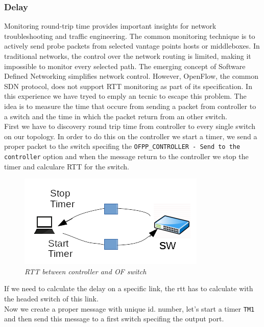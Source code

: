 \documentclass[article,10pt]{IEEEtran}
\begin{document}
\subsubsection{Delay}
Monitoring round-trip time provides important insights for network troubleshooting and traffic engineering.
The  common  monitoring  technique  is  to  actively  send  probe packets  from  selected  vantage  points  hosts  or  middleboxes.
In traditional  networks, the control over the network routing is
limited,  making  it  impossible  to  monitor  every  selected  path. The  emerging  concept  of  Software  Defined  Networking  simplifies
network  control.  However,  OpenFlow,  the  common  SDN protocol,   does   not   support   RTT   monitoring   as   part   of   its
specification. In this experience we have tryed to emply an tecnic to escape this problem\cite{rtt}.
\newline The idea is to measure the time that occure from sending a packet from controller to a switch and the time in which the packet return from
an other switch.
\\
\newline First we have to discovery round trip time from controller to every single switch on our topology.
In order to do this on the controller we start a timer, we send a proper packet to the switch specifing the \texttt{OFPP_CONTROLLER - Send to the controller}
option and when the message return to the controller we stop the timer and calculare RTT for the switch.
\begin{figure}[!h]
 \centering
 \includegraphics[scale=0.70]{images/rtt2.png}
 \caption{\emph{RTT between controller and OF switch}}
 \label{fig:topo}
\end{figure}
\newline
If we need to calculate the delay on a specific link, the rtt has to calculate with the headed switch of this link.
\\
\newline
Now we create a proper message with unique id. number, let's start a timer \texttt{TM1} and then send this message to a first switch specifing the output port.
\end{document}
